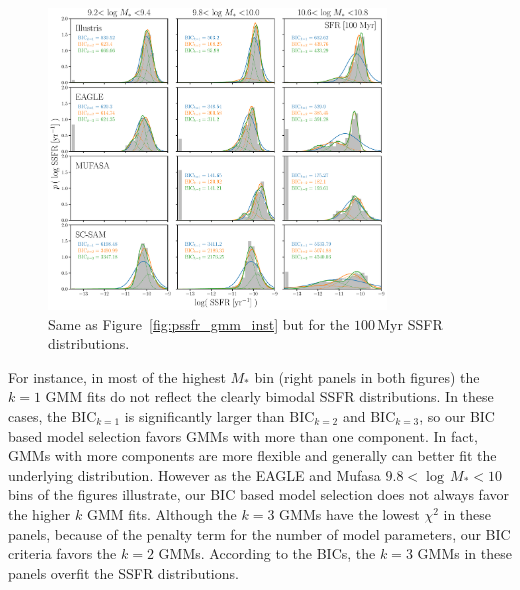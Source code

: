\documentclass[tighten, preprint]{aastex62}
\begin{document}
\begin{figure}
\begin{center}
\includegraphics[width=0.8\textwidth]{Pssfr_GMMcomps_100myr.pdf} 
\caption{Same as Figure~\ref{fig:pssfr_gmm_inst} but for the $100\,\mathrm{Myr}$
SSFR distributions.} 
\label{fig:pssfr_gmm_100myr}
\end{center}
\end{figure}
For instance, in most of the highest $M_*$ bin (right panels in both figures) 
the $k=1$ GMM fits do not reflect the clearly bimodal SSFR distributions.
In these cases, the $\mathrm{BIC}_{k=1}$ is significantly larger than
$\mathrm{BIC}_{k=2}$ and $\mathrm{BIC}_{k=3}$, so our BIC based model 
selection favors GMMs with more than one component. In fact, GMMs with
more components are more flexible and generally can better fit the underlying 
distribution. However as the EAGLE and {\sc Mufasa} $9.8 <\log\,M_*<10$ 
bins of the figures illustrate, our BIC based model selection does not 
always favor the higher $k$ GMM fits. Although the $k=3$ GMMs have the 
lowest $\chi^2$ in these panels, because of the penalty term for the 
number of model parameters, our BIC criteria favors the $k=2$ GMMs.
According to the BICs, the $k=3$ GMMs in these panels overfit the 
SSFR distributions.

\end{document}
